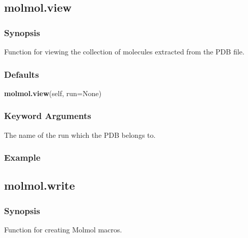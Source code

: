   

 \newpage 

 \subsection{molmol.view} 

  
 \subsubsection{Synopsis} 

 Function for viewing the collection of molecules extracted from the PDB file. 
  

  
 \subsubsection{Defaults} 

 \textsf{\textbf{molmol.view}(self, run=None)} 

  
 \subsubsection{Keyword Arguments} 

   The name of the run which the PDB belongs to.  

  

  
 \subsubsection{Example} 



  

 \newpage 

 \subsection{molmol.write} 

  
 \subsubsection{Synopsis} 

 Function for creating Molmol macros. 
  

